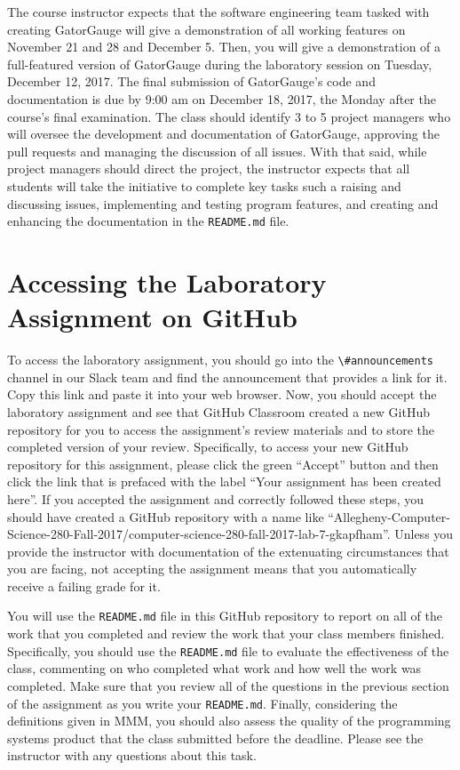 \documentclass[11pt]{article}
\newcommand{\reflection}{\lstinline{README.md}}
\newcommand{\program}[1]{\lstinline{#1}}
\newcommand{\channel}[1]{\lstinline{#1}}
\begin{document}
The course instructor expects that the software engineering team tasked with creating GatorGauge will give a
demonstration of all working features on November 21 and 28 and December 5. Then, you will give a demonstration of a
full-featured version of GatorGauge during the laboratory session on Tuesday, December 12, 2017. The final submission of
GatorGauge's code and documentation is due by 9:00 am on December 18, 2017, the Monday after the course's final
examination. The class should identify 3 to 5 project managers who will oversee the development and documentation of
GatorGauge, approving the pull requests and managing the discussion of all issues. With that said, while project
managers should direct the project, the instructor expects that all students will take the initiative to complete key
tasks such a raising and discussing issues, implementing and testing program features, and creating and enhancing the
documentation in the \program{README.md} file.

\section*{Accessing the Laboratory Assignment on GitHub}

To access the laboratory assignment, you should go into the \channel{\#announcements} channel in our Slack team and find
the announcement that provides a link for it. Copy this link and paste it into your web browser. Now, you should accept
the laboratory assignment and see that GitHub Classroom created a new GitHub repository for you to access the
assignment's review materials and to store the completed version of your review. Specifically, to access your new GitHub
repository for this assignment, please click the green ``Accept'' button and then click the link that is prefaced with
the label ``Your assignment has been created here''. If you accepted the assignment and correctly followed these steps,
you should have created a GitHub repository with a name like
``Allegheny-Computer-Science-280-Fall-2017/computer-science-280-fall-2017-lab-7-gkapfham''. Unless you provide the
instructor with documentation of the extenuating circumstances that you are facing, not accepting the assignment means
that you automatically receive a failing grade for it.

You will use the \reflection{} file in this GitHub repository to report on all of the work that you completed and review
the work that your class members finished. Specifically, you should use the \reflection{} file to evaluate the
effectiveness of the class, commenting on who completed what work and how well the work was completed. Make sure that
you review all of the questions in the previous section of the assignment as you write your \reflection{}. Finally,
considering the definitions given in MMM, you should also assess the quality of the programming systems product that the
class submitted before the deadline. Please see the instructor with any questions about this task.
\end{document}
